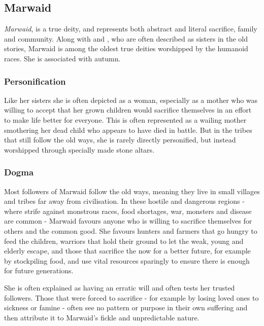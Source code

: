 \subsection{Marwaid}
\label{sec:Marwaid}

\emph{Marwaid}, is a true deity, and represents both abstract and literal
sacrifice, family and community. Along with  and
, who are often described as sisters in the old stories,
Marwaid is among the oldest true deities worshipped by the humanoid races. She
is associated with autumn.

\subsubsection{Personification}

Like her sisters she is often depicted as a woman, especially as a mother who
was willing to accept that her grown children would sacrifice themselves in an
effort to make life better for everyone. This is often represented as a
wailing mother smothering her dead child who appears to have died in
battle. But in the tribes that still follow the old ways, she is rarely
directly personified, but instead worshipped through specially made stone
altars.

\subsubsection{Dogma}

Most followers of Marwaid follow the old ways, meaning they live in small
villages and tribes far away from civilisation. In these hostile and dangerous
regions - where strife against monstrous races, food shortages, war, monsters
and disease are common - Marwaid favours anyone who is willing to sacrifice
themselves for others and the common good. She favours hunters and farmers
that go hungry to feed the children, warriors that hold their ground to let
the weak, young and elderly escape, and those that sacrifice the now for a
better future, for example by stockpiling food, and use vital resources
sparingly to ensure there is enough for future generations.

She is often explained as having an erratic will and often tests her trusted
followers. Those that were forced to sacrifice - for example by losing loved
ones to sickness or famine - often see no pattern or purpose in their own
suffering and then attribute it to Marwaid's fickle and unpredictable nature.

